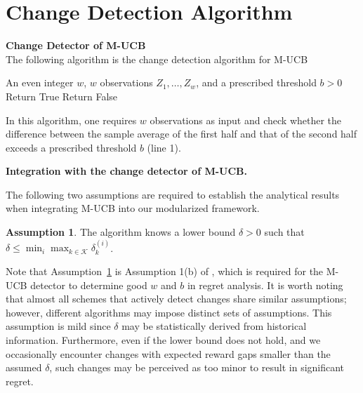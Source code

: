 \documentclass[twoside]{article}
\theoremstyle{plain}
\theoremstyle{definition}
\newtheorem{assumption}[theorem]{Assumption}
\theoremstyle{remark}
\def\jerry{\color{red}}
\begin{document}
% 


% 


\clearpage
\appendix
\thispagestyle{empty}


\appendix

\onecolumn


\section{Change Detection Algorithm}\label{app:cd_alg}
{\bf Change Detector of M-UCB } \\
The following algorithm is the change detection algorithm for M-UCB \citep{cao2019nearly}
\begin{center}
    \begin{minipage}{0.8\linewidth}
        \begin{algorithm}[H]
            \caption{Change Detection of M-UCB: CD$\left(w,b,Z_{1},\ldots,Z_{w}\right)$}\label{alg:mucb_cd}
            \begin{algorithmic}[1]
                \REQUIRE An even integer $w$, $w$ observations $Z_{1},\ldots,Z_{w}$, and a prescribed threshold $b > 0$
                \STATE Return True
                \ELSE
                \STATE Return False
                \ENDIF
            \end{algorithmic}
        \end{algorithm}
    \end{minipage}
\end{center}


In this algorithm, one requires $w$ observations as input and check whether the difference between the sample average of the first half and that of the second half exceeds a prescribed threshold $b$ (line 1).

{\bf Integration with the change detector of M-UCB.} 

The following two assumptions are required to establish the analytical results when integrating M-UCB into our modularized framework.
\begin{assumption}\label{ass:minimum_gap}
    The algorithm knows a lower bound $\delta>0$ such that $\delta\leq\min_{i}\max_{k\in\mathcal{K}}\delta^{\left(i\right)}_{k}$.
\end{assumption}
Note that Assumption~\ref{ass:minimum_gap} is Assumption 1(b) of \cite{cao2019nearly}, which is required for the M-UCB detector to determine good $w$ and $b$ in regret analysis. It is worth noting that almost all schemes that actively detect changes share similar assumptions; however, different algorithms may impose distinct sets of assumptions. This assumption is mild since $\delta$ may be statistically derived from historical information. Furthermore, even if the lower bound does not hold, and we occasionally encounter changes with expected reward gaps smaller than the assumed $\delta$, such changes may be perceived as too minor to result in significant regret. 
\end{document}
